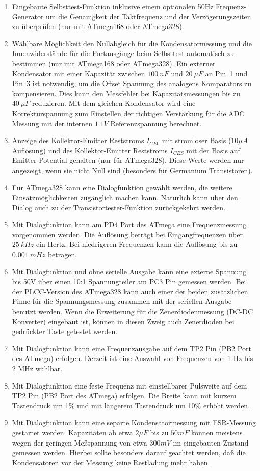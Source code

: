 \begin{enumerate}
\item Eingebaute Selbsttest-Funktion inklusive einem optionalen 50Hz Frequenz-Generator um die Genauigkeit der Taktfrequenz
und der Verzögerungszeiten zu überprüfen (nur mit ATmega168 oder ATmega328).
\item Wählbare Möglichkeit den Nullabgleich für die Kondensatormessung und die Innenwiderstände für die
Portausgänge beim Selbsttest automatisch zu bestimmen (nur mit ATmega168 oder ATmega328).
Ein externer Kondensator mit einer Kapazität zwischen \(100~nF\) und \(20~\mu F\) an Pin~1 und Pin~3 ist notwendig, 
um die Offset Spannung des analogens Komparators zu kompensieren.
Dies kann den Messfehler bei Kapazitätsmessungen bis zu \(40~\mu F\) reduzieren.
Mit dem gleichen Kondensator wird eine Korrekturspannung zum Einstellen der richtigen Verstärkung für
die ADC Messung mit der internen \(1.1V\) Referenzspannung berechnet.
\item Anzeige des Kollektor-Emitter Reststroms \(I_{CE0}\) mit stromloser Basis (\(10\mu A\) Auflösung) und
des Kollektor-Emitter Reststroms \(I_{CES}\) mit der Basis auf Emitter Potential gehalten (nur für ATmega328).
Diese Werte werden nur angezeigt, wenn sie nicht Null sind (besonders für Germanium Transistoren).
\item Für ATmega328 kann eine Dialogfunktion gewählt werden, die weitere Einsatzmöglichkeiten zugänglich machen kann.
Natürlich kann über den Dialog auch zu der Transistortester-Funktion zurückgekehrt werden.
\item Mit Dialogfunktion kann am PD4 Port des ATmega eine Frequenzmessung vorgenommen werden.
Die Auflösung beträgt bei Eingangfrequenzen über \(25~kHz\) ein Hertz.
Bei niedrigeren Frequenzen kann die Auflösung bis zu \(0.001~mHz\) betragen.
\item Mit Dialogfunktion und ohne serielle Ausgabe kann eine externe Spannung bis 50V über einen
10:1 Spannungteiler am PC3 Pin gemessen werden. Bei der PLCC-Version des ATmega328 kann auch einer der beiden
zusätzlichen Pinne für die Spannungsmessung zusammen mit der seriellen Ausgabe benutzt werden.
Wenn die Erweiterung für die Zenerdiodenmessung (DC-DC Konverter)
eingebaut ist, können in diesen Zweig auch Zenerdioden bei gedrückter Taste getestet werden.
\item Mit Dialogfunktion kann eine Frequenzausgabe auf dem TP2 Pin (PB2 Port des ATmega) erfolgen.
Derzeit ist eine Auswahl von Frequenzen von 1 Hz bis 2 MHz wählbar.
\item Mit Dialogfunktion eine feste Frequenz mit einstellbarer Pulsweite auf dem TP2 Pin (PB2 Port des ATmega) erfolgen.
Die Breite kann mit kurzem Tastendruck um 1\% und mit längerem Tastendruck um 10\% erhöht werden.
\item Mit Dialogfunktion kann eine separte Kondensatormessung mit ESR-Messung gestartet werden.
 Kapazitäten ab etwa \(2 \mu F\) bis zu \(50 mF\) können meistens wegen der geringen Meßspannung von etwa \(300 mV\)
 im eingebauten Zustand gemessen werden.
 Hierbei sollte besonders darauf geachtet werden, daß die Kondensatoren vor der Messung keine Restladung mehr haben.

\end{enumerate}

